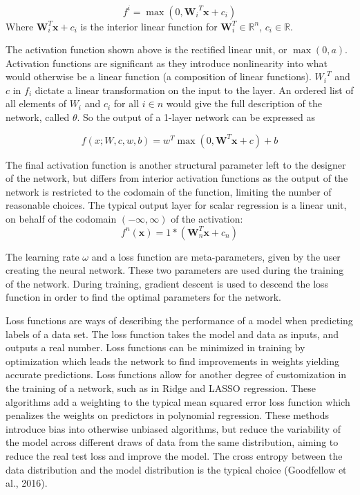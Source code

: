 \documentclass[12pt,twoside]{reedthesis}
\begin{document}
\[
f^i = \max ( 0 , {\boldsymbol{W}_i}^T \boldsymbol{x} + c_i)
\] Where \(\boldsymbol{W}_i^T \boldsymbol{x} + c_i\) is the interior
linear function for \(\boldsymbol{W}_i^T \in \mathbb{R}^n\),
\(c_i \in \mathbb{R}\).

The activation function shown above is the rectified linear unit, or
\(\max(0,a)\). Activation functions are significant as they introduce
nonlinearity into what would otherwise be a linear function (a
composition of linear functions). \({W_i}^T\) and \(c\) in \(f_i\)
dictate a linear transformation on the input to the layer. An ordered
list of all elements of \(W_i\) and \(c_i\) for all \(i \in n\) would
give the full description of the network, called \(\theta\). So the
output of a 1-layer network can be expressed as

\[
f(x; W, c, w, b) = w^T \max( 0 , \boldsymbol{W}^T \boldsymbol{x} +c ) +b
\]

The final activation function is another structural parameter left to
the designer of the network, but differs from interior activation
functions as the output of the network is restricted to the codomain of
the function, limiting the number of reasonable choices. The typical
output layer for scalar regression is a linear unit, on behalf of the
codomain \((-\infty,\infty)\) of the activation: \[
f^n(\boldsymbol{x}) = 1*(\boldsymbol{W}_n^T \boldsymbol{x} + c_n)
\]

The learning rate \(\omega\) and a loss function are meta-parameters,
given by the user creating the neural network. These two parameters are
used during the training of the network. During training, gradient
descent is used to descend the loss function in order to find the
optimal parameters for the network.

Loss functions are ways of describing the performance of a model when
predicting labels of a data set. The loss function takes the model and
data as inputs, and outputs a real number. Loss functions can be
minimized in training by optimization which leads the network to find
improvements in weights yielding accurate predictions. Loss functions
allow for another degree of customization in the training of a network,
such as in Ridge and LASSO regression. These algorithms add a weighting
to the typical mean squared error loss function which penalizes the
weights on predictors in polynomial regression. These methods introduce
bias into otherwise unbiased algorithms, but reduce the variability of
the model across different draws of data from the same distribution,
aiming to reduce the real test loss and improve the model. The cross
entropy between the data distribution and the model distribution is the
typical choice (Goodfellow et al., 2016).
\end{document}
